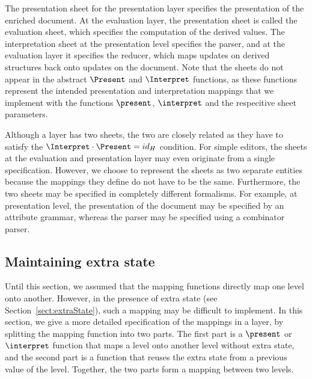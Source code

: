 The presentation sheet for the presentation layer specifies the presentation of the enriched document. At the evaluation layer, the presentation sheet is called the evaluation sheet, which specifies the computation of the derived values. The interpretation sheet at the presentation level specifies the parser, and at the evaluation layer it specifies the reducer, which maps updates on derived structures back onto updates on the document. Note that the sheets do not appear in the abstract $\Present$ and $\Interpret$ functions, as these functions represent the intended presentation and interpretation mappings that we implement with the functions 
$\present$, $\interpret$ and the respecitive sheet parameters.

Although a layer has two sheets, the two are closely related as they have to satisfy the
$\Interpret \cdot \Present = id_{H}$ condition. For simple editors, the sheets at the evaluation and presentation layer may even originate from a single specification. However, we choose to represent the sheets as two separate entities because the mappings they define do not have to be the same.  Furthermore, the two sheets may be specified in completely different formalisms. For example, at presentation level, the presentation of the document may be specified by an attribute grammar, whereas the parser may be specified using a combinator parser\cite{combinatorparser}.



%																
%																
%																
\subsection{Maintaining extra state} \label{sect:maintainingExtraState}

Until this section, we assumed that the mapping functions directly map one level onto another. However, in the presence of extra state (see Section~\ref{sect:extraState}), such a mapping may be difficult to implement. In this section, we give a more detailed specification of the mappings in a layer, by splitting the mapping function into two parts. The first part is a $\present$ or $\interpret$ function that maps a level onto another level without extra state, and the second part is a function that reuses the extra state from a previous value of the level. Together, the two parts form a mapping between two levels.

